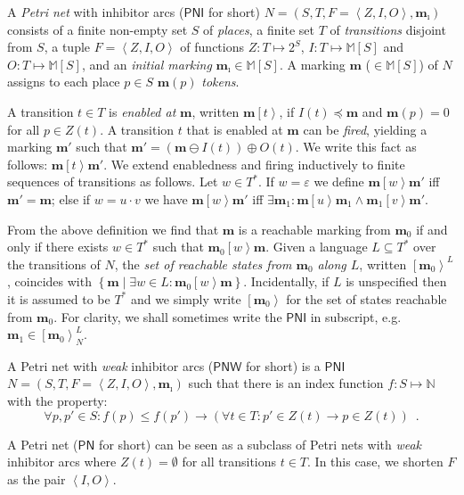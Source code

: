 \documentclass{fsttcs}
\def\set#1{{\left\{ #1 \right\}}}
\def\tuple#1{{\left\langle #1 \right\rangle}}
\def\nats{{\mathbb{N}}}
\newcommand{\multiset}[1]{{\mathbb{M}[ #1 ]}}
\def\mmap{\mathbf{m}}
\newcommand{\fire}[1]{\left[ {#1}\right\rangle}
\def\pn{\mathsf{PN}}
\def\pni{\mathsf{PNI}}
\def\pnw{\mathsf{PNW}}
\begin{document}
A {\em Petri net} with inhibitor arcs ($\pni$ for short)
$N=(S,T,F=\tuple{Z,I,O},\mmap_{\imath})$ consists of a finite non-empty set $S$
of \emph{places}, a finite set $T$ of \emph{transitions} disjoint from $S$, a
tuple $F=\tuple{Z,I,O}$ of functions $Z \colon T \mapsto 2^S$, $I\colon
T\mapsto\multiset{S}$ and $O\colon T\mapsto\multiset{S}$, and an \emph{initial
marking} $\mmap_{\imath}\in\multiset{S}$.  
A marking \(\mmap\) (\(\in \multiset{S}\)) of \(N\) assigns to each place
\(p\in S\) \(\mmap(p)\) \emph{tokens}.

A transition $t\in T$ is \emph{enabled at} $\mmap$, written $\mmap\fire{t}$, if
$I(t)\preceq\mmap$ and $\mmap(p)=0$  for all $p \in Z(t)$.  A transition $t$ that is enabled at $\mmap$ can be 
\emph{fired}, yielding a marking $\mmap'$ such that $\mmap'=(\mmap\ominus I(t))\oplus O(t)$. We write this fact as follows: $\mmap\fire{t}\mmap'$.
We extend enabledness and firing inductively to
finite sequences of transitions as follows. 
Let $w\in T^*$.
If $w=\varepsilon$ we define $\mmap\fire{w}\mmap'$ if{}f 
$\mmap'=\mmap$; else if $w=u\cdot v$ we
have $\mmap\fire{w}\mmap'$ if{}f \(\exists\mmap_{1}\colon\mmap\fire{u}\mmap_{1}\land\mmap_1\fire{v}\mmap'\).  

From the above definition we find that $\mmap$ is a reachable  marking from
$\mmap_{0}$ if and only if there exists $w\in T^*$ such that $\mmap_{0}\fire{w}\mmap$.
Given a language $L\subseteq T^*$ over the transitions of $N$, the \emph{set of
reachable states from $\mmap_{0}$ along $L$}, written $\fire{\mmap_{0}}^L$,
coincides with $\set{\mmap\mid\exists w\in L\colon \mmap_{0}\fire{w}\mmap}$.
Incidentally, if $L$ is unspecified then it is assumed to be $T^*$ and we
simply write $\fire{\mmap_{0}}$ for the set of states reachable from
$\mmap_{0}$. For clarity, we shall sometimes write the \(\pni\) in subscript,
e.g. \(\mmap_1\in\fire{\mmap_0}^L_N\).

A Petri net with {\em weak} inhibitor arcs ($\pnw$ for short)  is a $\pni$ $N=(S,T,F=\tuple{Z,I,O},\mmap_{\imath})$ such that there is an index function \(f\colon S\mapsto\nats\) with the property: \begin{equation}
\forall p,p'\in S\colon f(p)\leq f(p') \rightarrow (\forall t\in T\colon p'\in Z(t)\rightarrow p\in Z(t))\enspace .\label{eq:reinhardt}
\end{equation}

A Petri net ($\pn$ for short) can be seen as a subclass of Petri nets with {\em weak} inhibitor arcs where $Z(t)=\emptyset$ for all transitions $t \in T$. In this case, we shorten $F$ as the pair $\tuple{I,O}$.
\end{document}
